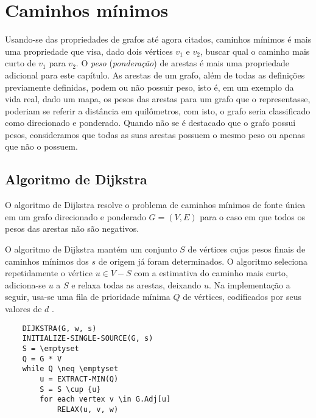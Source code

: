 \graphicspath{{\currfiledir/images/}}

\chapter{Caminhos mínimos}
Usando-se das propriedades de grafos até agora citados, caminhos mínimos é mais uma propriedade que visa, dado dois vértices $v_1$ e $v_2$, buscar qual o caminho mais curto de $v_1$ para $v_2$. O \emph{peso} (\emph{ponderação}) de arestas é mais uma propriedade adicional para este capítulo. As arestas de um grafo, além de todas as definições previamente definidas, podem ou não possuir peso, isto é, em um exemplo da vida real, dado um mapa, os pesos das arestas para um grafo que o representasse, poderiam se referir a distância em quilômetros, com isto, o grafo seria classificado como direcionado e ponderado. Quando não se é destacado que o grafo possui pesos, consideramos que todas as suas arestas possuem o mesmo peso ou apenas que não o possuem.

\section{Algoritmo de Dijkstra}
O algoritmo de Dijkstra resolve o problema de caminhos mínimos de fonte única em um grafo direcionado e ponderado $G = (V, E)$ para o caso em que todos os pesos das arestas não são negativos.

O algoritmo de Dijkstra mantém um conjunto $S$ de vértices cujos pesos finais de caminhos mínimos dos $s$ de origem já foram determinados. O algoritmo seleciona repetidamente o vértice $u \in V - S$ com a estimativa do caminho mais curto, adiciona-se $u$ a $S$ e relaxa todas as arestas, deixando $u$. Na implementação a seguir, usa-se uma fila de prioridade mínima $Q$ de vértices, codificados por seus valores de $d$ \cite{cormen2009}.

\begin{lstlisting}
	DIJKSTRA(G, w, s)
	INITIALIZE-SINGLE-SOURCE(G, s)
	S = \emptyset
	Q = G * V
	while Q \neq \emptyset
		u = EXTRACT-MIN(Q)
		S = S \cup {u}
		for each vertex v \in G.Adj[u]
			RELAX(u, v, w)
\end{lstlisting}

